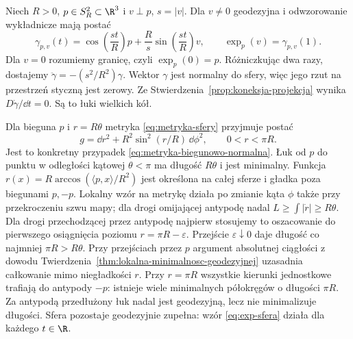 \begin{przyklad}
\label{prz:geodezyjne-sfera}
Niech $R>0$, $p\in S_R^2\subset\R^3$ i $v\perp p$,
$s=|v|$. Dla $v\ne0$ geodezyjna i odwzorowanie
wykładnicze mają postać
\begin{equation}\label{eq:exp-sfera}
 \gamma_{p,v}(t)
 =\cos\!\left(\frac{st}{R}\right)p
  +\frac{R}{s}\sin\!\left(\frac{st}{R}\right)v,
 \qquad \exp_p(v)=\gamma_{p,v}(1).
\end{equation}
Dla $v=0$ rozumiemy granicę, czyli $\exp_p(0)=p$.
Różniczkując dwa razy, dostajemy
$\ddot\gamma=-(s^2/R^2)\gamma$.
Wektor $\gamma$ jest normalny do sfery,
więc jego rzut na przestrzeń styczną jest zerowy.
Ze Stwierdzenia~\ref{prop:koneksja-projekcja} wynika
$D\dot\gamma/\dd t=0$. Są to łuki wielkich kół.

Dla bieguna $p$ i $r=R\theta$ metryka
\eqref{eq:metryka-sfery} przyjmuje postać
\[
 g=\dd r^2+R^2\sin^2(r/R)\,\dd\phi^2,
 \qquad 0<r<\pi R.
\]
Jest to konkretny przypadek
\eqref{eq:metryka-biegunowo-normalna}.
Łuk od $p$ do punktu w odległości kątowej
$\theta<\pi$ ma długość $R\theta$ i jest
minimalny. Funkcja
$r(x)=R\arccos(\langle p,x\rangle/R^2)$
jest określona na całej sferze i gładka
poza biegunami $p,-p$. Lokalny wzór na metrykę
działa po zmianie kąta $\phi$ także przy
przekroczeniu szwu mapy; dla drogi omijającej
antypodę nadal $L\geq\int|\dot r|\geq R\theta$.
Dla drogi przechodzącej przez antypodę najpierw stosujemy
to oszacowanie do pierwszego osiągnięcia poziomu
$r=\pi R-\varepsilon$. Przejście $\varepsilon\downarrow0$
daje długość co najmniej $\pi R>R\theta$.
Przy przejściach przez $p$ argument absolutnej ciągłości
z dowodu Twierdzenia~\ref{thm:lokalna-minimalnosc-geodezyjnej}
uzasadnia całkowanie mimo niegładkości $r$.
Przy $r=\pi R$ wszystkie kierunki jednostkowe
trafiają do antypody $-p$: istnieje wiele
minimalnych półokręgów o długości $\pi R$.
Za antypodą przedłużony łuk nadal jest
geodezyjną, lecz nie minimalizuje długości.
Sfera pozostaje geodezyjnie zupełna: wzór
\eqref{eq:exp-sfera} działa dla każdego $t\in\R$.
\end{przyklad}

